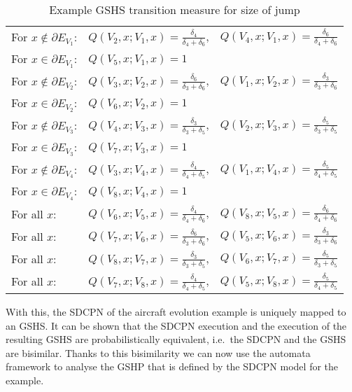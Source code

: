 \documentclass[copyright,creativecommons]{eptcs}
\begin{document}
\begin{table}[ht]
\centering \caption{Example GSHS transition measure for size of jump}
\label{tab:Q}
\begin{tabular}{|lll|}
\hline
For $x \notin \partial E_{V_1}$:  &
   $Q(V_2,x;V_1,x) = \frac{\delta_4}{\delta_4+\delta_6}$,    &
   $Q(V_4,x;V_1,x) = \frac{\delta_6}{\delta_4+\delta_6}$ \\
For $x \in \partial E_{V_1}$:    & $Q(V_5,x;V_1,x) = 1$ &  \\
\hline For $x \notin \partial E_{V_2}$:    &
   $Q(V_3,x;V_2,x) = \frac{\delta_6}{\delta_3+\delta_6}$,   &
   $Q(V_1,x;V_2,x) = \frac{\delta_3}{\delta_3+\delta_6}$ \\
For $x \in \partial E_{V_2}$:    & $Q(V_6,x;V_2,x) = 1$    &  \\
\hline For $x \notin \partial E_{V_3}$:    &
   $Q(V_4,x;V_3,x) = \frac{\delta_3}{\delta_3+\delta_5}$,    &
   $Q(V_2,x;V_3,x) = \frac{\delta_5}{\delta_3+\delta_5}$ \\
For $x \in \partial E_{V_3}$:    & $Q(V_7,x;V_3,x) = 1$    &  \\
\hline For $x \notin \partial E_{V_4}$:    &
   $Q(V_3,x;V_4,x) = \frac{\delta_4}{\delta_4+\delta_5}$,   &
   $Q(V_1,x;V_4,x) = \frac{\delta_5}{\delta_4+\delta_5}$ \\
For $x \in \partial E_{V_4}$:    & $Q(V_8,x;V_4,x) = 1$    &  \\
\hline For all $x$:  & $Q(V_6,x;V_5,x) =
\frac{\delta_4}{\delta_4+\delta_6}$,    & $Q(V_8,x;V_5,x) =
\frac{\delta_6}{\delta_4+\delta_6}$ \\ \hline For all $x$:    &
$Q(V_7,x;V_6,x) = \frac{\delta_6}{\delta_3+\delta_6}$,    &
$Q(V_5,x;V_6,x) = \frac{\delta_3}{\delta_3+\delta_6}$ \\ \hline
For all $x$:    & $Q(V_8,x;V_7,x) =
\frac{\delta_3}{\delta_3+\delta_5}$,    & $Q(V_6,x;V_7,x) =
\frac{\delta_5}{\delta_3+\delta_5}$ \\ \hline For all $x$:    &
$Q(V_7,x;V_8,x) = \frac{\delta_4}{\delta_4+\delta_5}$,   &
$Q(V_5,x;V_8,x) =
\frac{\delta_5}{\delta_4+\delta_5}$ \\
\hline
\end{tabular}
\end{table}

With this, the SDCPN of the aircraft evolution example is uniquely
mapped to an GSHS. It can be shown that the SDCPN execution and the
execution of the resulting GSHS are probabilistically equivalent,
i.e.\ the SDCPN and the GSHS are bisimilar. Thanks to this bisimilarity
we can now use the automata framework to analyse the GSHP that is
defined by the SDCPN model for the example.
\end{document}
